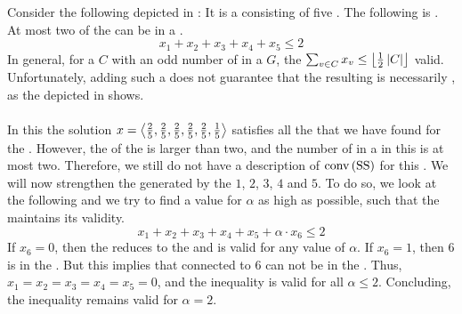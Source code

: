 \begin{example}
Consider the following  depicted in : It is a  consisting of five . The following  is . At most two  of the  can be in a .
\begin{equation}
x_1+x_2+x_3+x_4+x_5\leq 2
\end{equation}
In general, for a  $C$ with an odd number of  in a  $G$, the  $\isumdomain[v]{C}{x_v\leq\floor{\frac{1}{2}\abs{C}}}$ valid. Unfortunately, adding such a  does not guarantee that the resulting  is necessarily , as the  depicted in  shows.



\paragraph{}
In this  the solution $x=\tupl{\frac{2}{5},\frac{2}{5},\frac{2}{5},\frac{2}{5},\frac{2}{5},\frac{1}{5}}$ satisfies all the  that we have found for the . However, the  of the  is larger than two, and the number of  in a  in this  is at most two. Therefore, we still do not have a description of $\funm{conv}{\mbox{SS}}$ for this . We will now strengthen the  generated by the  $1$, $2$, $3$, $4$ and $5$. To do so, we look at the following  and we try to find a value for $\alpha$ as high as possible, such that the  maintains its validity.
\begin{equation}
x_1+x_2+x_3+x_4+x_5+\alpha\cdot x_6\leq 2
\end{equation}
If $x_6=0$, then the  reduces to the  and is valid for any value of $\alpha$. If $x_6=1$, then  $6$ is in the . But this implies that  connected to $6$ can not be in the . Thus, $x_1=x_2=x_3=x_4=x_5=0$, and the inequality is valid for all $\alpha\leq 2$. Concluding, the inequality remains valid for $\alpha=2$.
\end{example}
